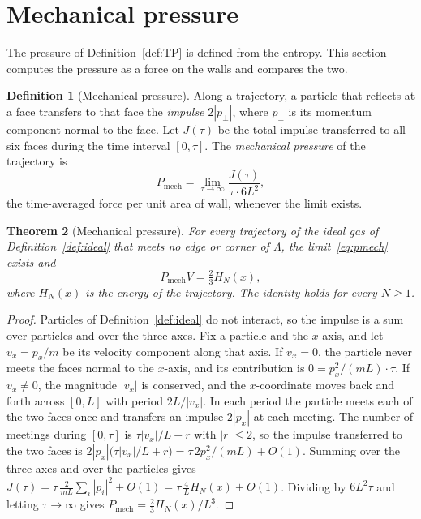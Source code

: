 \documentclass[11pt,a4paper]{article}
\newtheorem{theorem}{Theorem}[section]
\theoremstyle{definition}
\newtheorem{definition}[theorem]{Definition}
\theoremstyle{remark}
\newcommand{\Pmech}{P_{\mathrm{mech}}}
\begin{document}
\section{Mechanical pressure}
\label{sec:mech}

The pressure of Definition~\ref{def:TP} is defined from the entropy.
This section computes the pressure as a force on the walls and compares the two.

\begin{definition}[Mechanical pressure]
\label{def:mech}
Along a trajectory, a particle that reflects at a face transfers to that face the \emph{impulse} $2|p_\perp|$, where $p_\perp$ is its momentum component normal to the face.
Let $J(\tau)$ be the total impulse transferred to all six faces during the time interval $[0,\tau]$.
The \emph{mechanical pressure} of the trajectory is
\begin{equation}
\Pmech=\lim_{\tau\to\infty}\frac{J(\tau)}{\tau\cdot6L^{2}},
\label{eq:pmech}
\end{equation}
the time-averaged force per unit area of wall, whenever the limit exists.
\end{definition}

\begin{theorem}[Mechanical pressure]
\label{thm:mech}
For every trajectory of the ideal gas of Definition~\ref{def:ideal} that meets no edge or corner of $\Lambda$, the limit~\eqref{eq:pmech} exists and
\begin{equation}
\Pmech V=\tfrac23H_N(x),
\label{eq:pmech-value}
\end{equation}
where $H_N(x)$ is the energy of the trajectory.
The identity holds for every $N\ge1$.
\end{theorem}

\begin{proof}
Particles of Definition~\ref{def:ideal} do not interact, so the impulse is a sum over particles and over the three axes.
Fix a particle and the $x$-axis, and let $v_x=p_x/m$ be its velocity component along that axis.
If $v_x=0$, the particle never meets the faces normal to the $x$-axis, and its contribution is $0=p_x^{2}/(mL)\cdot\tau$.
If $v_x\ne0$, the magnitude $|v_x|$ is conserved, and the $x$-coordinate moves back and forth across $[0,L]$ with period $2L/|v_x|$.
In each period the particle meets each of the two faces once and transfers an impulse $2|p_x|$ at each meeting.
The number of meetings during $[0,\tau]$ is $\tau|v_x|/L+r$ with $|r|\le2$, so the impulse transferred to the two faces is $2|p_x|\bigl(\tau|v_x|/L+r\bigr)=\tau\,2p_x^{2}/(mL)+O(1)$.
Summing over the three axes and over the particles gives $J(\tau)=\tau\,\frac{2}{mL}\sum_i|p_i|^{2}+O(1)=\tau\,\frac{4}{L}H_N(x)+O(1)$.
Dividing by $6L^{2}\tau$ and letting $\tau\to\infty$ gives $\Pmech=\tfrac{2}{3}H_N(x)/L^{3}$.
\end{proof}
\end{document}
